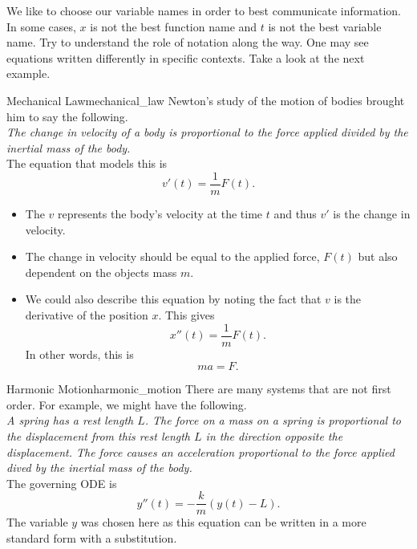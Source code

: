        We like to choose our variable names in order to best communicate information.  In some cases, $x$ is not the best function name and $t$ is not the best variable name.  Try to understand the role of notation along the way.  One may see equations written differently in specific contexts. Take a look at the next example. 
        
        \begin{ex}{Mechanical Law}{mechanical_law}
        Newton's study of the motion of bodies brought him to say the following.\\
        
        \emph{The change in velocity of a body is proportional to the force applied divided by the inertial mass of the body.}\\
        
        The equation that models this is
        \[
        v'(t)=\frac{1}{m} F(t).
        \]
        \begin{itemize}
            \item The $v$ represents the body's velocity at the time $t$ and thus $v'$ is the change in velocity.
            \item The change in velocity should be equal to the applied force, $F(t)$ but also dependent on the objects mass $m$.
            \item We could also describe this equation by noting the fact that $v$ is the derivative of the position $x$. This gives
            \[
            x''(t)=\frac{1}{m}F(t).
            \]
            In other words, this is
            \[
            ma=F.
            \]
        \end{itemize}
        \end{ex}
        
        \begin{ex}{Harmonic Motion}{harmonic_motion}
        There are many systems that are not first order.  For example, we might have the following.\\
        
        \emph{A spring has a rest length $L$. The force on a mass on a spring is proportional to the displacement from this rest length $L$ in the direction opposite the displacement. The force causes an acceleration proportional to the force applied dived by the inertial mass of the body.}\\
        
        The governing ODE is
        \[
        y''(t) = -\frac{k}{m}(y(t)-L).
        \]
        The variable $y$ was chosen here as this equation can be written in a more standard form with a substitution.
        \end{ex}
        
